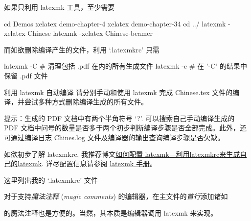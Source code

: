 如果只利用 latexmk 工具，至少需要
\begin{bashlst}[numbers=left]
cd Demos
xelatex demo-chapter-4
xelatex demo-chapter-34
cd ../
latexmk -xelatex Chinese
latexmk -xelatex Chinese-beamer
\end{bashlst}
而如欲删除编译产生的文件，利用 `.latexmkrc' 只需
\begin{bashlst}
latexmk -C  # 清理包括 .pdf 在内的所有生成文件
latexmk -c  # 在 '-C' 的结果中保留 .pdf 文件
\end{bashlst}

\begin{Ex}{利用 latexmk 自动编译}
请分别手动和使用 latexmk 完成 Chinese.tex 文件的编译，并尝试多种方式删除编译生成的所有文件。\\ \myhrule

提示：生成的 PDF 文档中有两个半角符号 `?'. 可以搜索自己手动编译生成的 PDF 文档中问号的数量是否多于两个初步判断编译步骤是否全部完成。此外，还可通过编译日志 Chines.log 文件及编译器的输出查询编译步骤是否欠缺。
\end{Ex}

如欲初步了解 latexmkrc, 我推荐博文\href{https://blog.prosight.me/2019/05/23/latexmk/}{如何配置 latexmk---利用latexmkrc来生成自己的latexmk}. 详尽配置信息请参阅 \href{http://personal.psu.edu/jcc8//software/latexmk-jcc/}{latexmk 手册}。

这里列出我的 `.latexmkrc' 文件

对于支持\emph{魔法注释} (\emph{magic comments}) 的编辑器，在主文件的\emph{首行}添加诸如
\begin{texlst}[numbers=left]
\end{texlst}
的魔法注释也是方便的。当然，其本质是编辑器调用 latexmk 来实现。